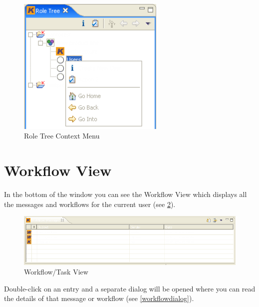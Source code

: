 \begin{figure}[h!]
\begin{center}
\includegraphics[width=7cm]{rolekontext.png}
   \caption{Role Tree Context Menu}
\label{rolekontext}
\end{center}
\end{figure}\par



\section{Workflow View}

In the bottom of the window you can see the Workflow View which displays all 
the messages and workflows for the current user (see \ref{workflow}). 

\begin{figure}[h!]
\begin{center}
\includegraphics[width=15cm]{workflow.png}
   \caption{Workflow/Task View}
\label{workflow}
\end{center}
\end{figure}\par

Double-click on an entry and a 
separate dialog will be opened where you can read the details of that message or
workflow (see \ref{workflowdialog}).

